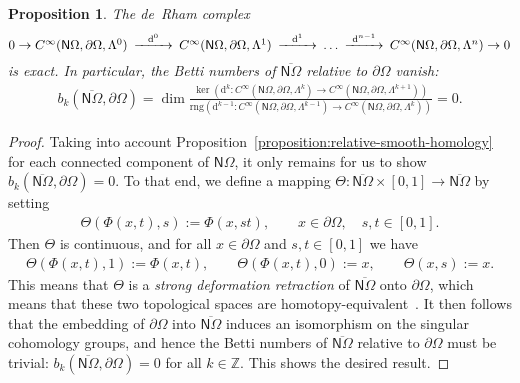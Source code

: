 \documentclass[10pt,a4paper]{amsart}
\newtheorem{proposition}[theorem]{Proposition}
\theoremstyle{definition}
\theoremstyle{remark}
\numberwithin{equation}{section}
\newcommand{\bbZ}{{\mathbb Z}}
\newcommand{\sfN}{{\mathsf N}}
\newcommand{\closure}{\overline}
\newcommand{\cartan}{{\mathrm d}}
\newcommand{\Domain}{{\Omega}}
\newcommand{\Collar}{{\sfN\Omega}}
\newcommand{\Alt}[1]{\Lambda^{#1}}
\newcommand{\rng}{\mathrm{rng}}
\begin{document}
\begin{proposition}\label{proposition:collar-homology}
    The de~Rham complex 
    \begin{align*}
        \begin{CD}
            0 \to C^{\infty}(\Collar,\partial\Domain,\Alt{0}) 
            @>\cartan^{  0}>> 
            C^{\infty}(\Collar,\partial\Domain,\Alt{1})
            @>\cartan^{  1}>> 
            \dots 
            @>\cartan^{n-1}>> 
            C^{\infty}(\Collar,\partial\Domain,\Alt{n}) 
            \to 0
        \end{CD}
    \end{align*}
    is exact. 
    In particular, the Betti numbers of $\closure\Collar$ relative to $\partial\Domain$ vanish:
    \begin{align*}
        b_{k}(\closure\Collar,\partial\Domain) 
        = 
        \dim 
        \frac{ 
            \ker\left( \cartan^{k} : C^{\infty}(\Collar,\partial\Domain,\Alt{k}) \to C^{\infty}(\Collar,\partial\Domain,\Alt{k+1}) \right)
        }{
            \rng\left( \cartan^{k-1} : C^{\infty}(\Collar,\partial\Domain,\Alt{k-1}) \to C^{\infty}(\Collar,\partial\Domain,\Alt{k}) \right)
        } 
        = 
        0.
    \end{align*}
\end{proposition}
\begin{proof}
    Taking into account Proposition~\ref{proposition:relative-smooth-homology} for each connected component of $\Collar$, 
    it only remains for us to show $b_{k}(\closure\Collar,\partial\Domain) = 0$. 
    To that end, we define a mapping $\Theta : \closure\Collar \times [0,1] \to \closure\Collar$ by setting 
    \begin{align*}
        \Theta( \Phi(x,t), s ) := \Phi(x, s t), \qquad x \in \partial\Domain, \quad s, t \in [0,1].
    \end{align*}
    Then $\Theta$ is continuous, and for all $x \in \partial\Domain$ and $s, t \in [0,1]$ we have 
    \begin{align*}
        \Theta( \Phi(x,t), 1 ) := \Phi(x,t), 
        \qquad 
        \Theta( \Phi(x,t), 0 ) := x, 
        \qquad 
        \Theta( x, s ) := x.
    \end{align*}
    This means that $\Theta$ is a \emph{strong deformation retraction} of $\closure\Collar$ onto $\partial\Domain$,
    which means that these two topological spaces are homotopy-equivalent~\cite[2.4.1, 2.4.3]{stocker_zieschang}. 
    It then follows that the embedding of $\partial\Domain$ into $\closure\Collar$ induces an isomorphism on the singular cohomology groups, 
    and hence the Betti numbers of $\closure\Collar$ relative to $\partial\Domain$ must be trivial:
    $b_{k}( \closure\Collar, \partial\Domain ) = 0$ for all $k \in \bbZ$. 
    This shows the desired result. 
\end{proof}
\end{document}
